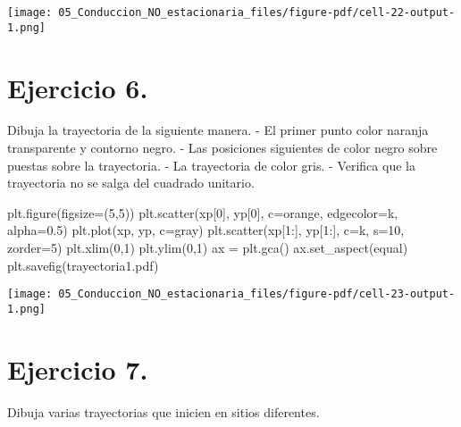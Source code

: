 \documentclass[
  letterpaper,
  DIV=11,
  numbers=noendperiod]{scrreprt}
\newenvironment{Shaded}{\begin{snugshade}}{\end{snugshade}}
\newcommand{\DecValTok}[1]{\textcolor[rgb]{0.68,0.00,0.00}{#1}}
\newcommand{\FloatTok}[1]{\textcolor[rgb]{0.68,0.00,0.00}{#1}}
\newcommand{\NormalTok}[1]{\textcolor[rgb]{0.00,0.23,0.31}{#1}}
\newcommand{\OperatorTok}[1]{\textcolor[rgb]{0.37,0.37,0.37}{#1}}
\newcommand{\StringTok}[1]{\textcolor[rgb]{0.13,0.47,0.30}{#1}}
\begin{document}
\texttt{[image: 05\_Conduccion\_NO\_estacionaria\_files/figure-pdf/cell-22-output-1.png]}

\section{Ejercicio 6.}\label{ejercicio-6.}

Dibuja la trayectoria de la siguiente manera. - El primer punto color
naranja transparente y contorno negro. - Las posiciones siguientes de
color negro sobre puestas sobre la trayectoria. - La trayectoria de
color gris. - Verifica que la trayectoria no se salga del cuadrado
unitario.

\begin{Shaded}
\begin{Highlighting}[]
\NormalTok{plt.figure(figsize}\OperatorTok{=}\NormalTok{(}\DecValTok{5}\NormalTok{,}\DecValTok{5}\NormalTok{))}
\NormalTok{plt.scatter(xp[}\DecValTok{0}\NormalTok{], yp[}\DecValTok{0}\NormalTok{], c}\OperatorTok{=}\StringTok{\textquotesingle{}orange\textquotesingle{}}\NormalTok{, edgecolor}\OperatorTok{=}\StringTok{\textquotesingle{}k\textquotesingle{}}\NormalTok{, alpha}\OperatorTok{=}\FloatTok{0.5}\NormalTok{)}
\NormalTok{plt.plot(xp, yp, c}\OperatorTok{=}\StringTok{\textquotesingle{}gray\textquotesingle{}}\NormalTok{)}
\NormalTok{plt.scatter(xp[}\DecValTok{1}\NormalTok{:], yp[}\DecValTok{1}\NormalTok{:], c}\OperatorTok{=}\StringTok{\textquotesingle{}k\textquotesingle{}}\NormalTok{, s}\OperatorTok{=}\DecValTok{10}\NormalTok{, zorder}\OperatorTok{=}\DecValTok{5}\NormalTok{)}
\NormalTok{plt.xlim(}\DecValTok{0}\NormalTok{,}\DecValTok{1}\NormalTok{)}
\NormalTok{plt.ylim(}\DecValTok{0}\NormalTok{,}\DecValTok{1}\NormalTok{)}
\NormalTok{ax }\OperatorTok{=}\NormalTok{ plt.gca()}
\NormalTok{ax.set\_aspect(}\StringTok{\textquotesingle{}equal\textquotesingle{}}\NormalTok{)}
\NormalTok{plt.savefig(}\StringTok{\textquotesingle{}trayectoria1.pdf\textquotesingle{}}\NormalTok{)}
\end{Highlighting}
\end{Shaded}

\texttt{[image: 05\_Conduccion\_NO\_estacionaria\_files/figure-pdf/cell-23-output-1.png]}

\section{Ejercicio 7.}\label{ejercicio-7.}

Dibuja varias trayectorias que inicien en sitios diferentes.
\end{document}
